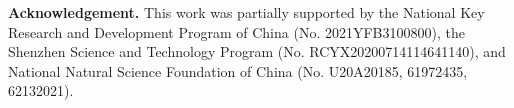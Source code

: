 \documentclass[10pt,twocolumn,letterpaper]{article}
\begin{document}
\noindent\textbf{Acknowledgement.}
This work was partially supported by the National Key Research and Development Program of China (No. 2021YFB3100800),  the Shenzhen Science and Technology Program (No. RCYX20200714114641140), and National Natural Science Foundation of China (No. U20A20185, 61972435, 62132021).

{\small


}
\end{document}
